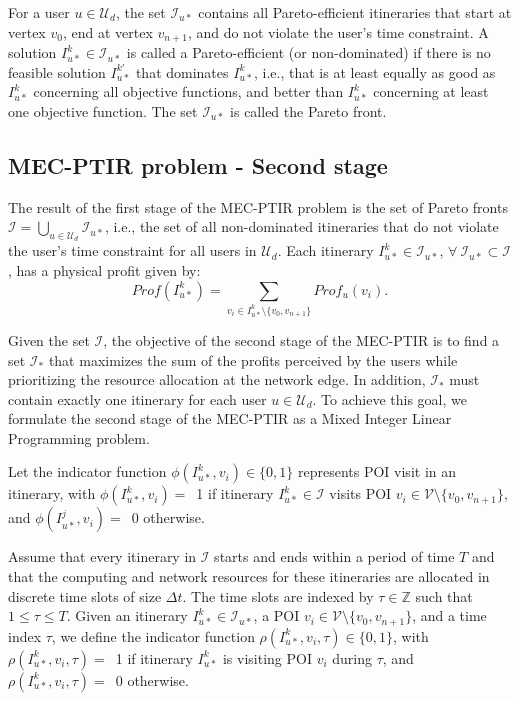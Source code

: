 For a user $u \in \mathcal{U}_d$, the set $\mathcal{I}_{u*}$ contains all Pareto-efficient itineraries that start at vertex $v_0$, end at vertex $v_{n+1}$, and do not violate the user's time constraint. A solution $I_{u*}^{k} \in \mathcal{I}_{u*}$ is called a Pareto-efficient (or non-dominated) if there is no feasible solution $I_{u*}^{k'}$ that dominates $I_{u*}^{k}$, i.e., that is at least equally as good as $I_{u*}^{k}$ concerning all objective functions, and better than $I_{u*}^{k}$ concerning at least one objective function. The set $\mathcal{I}_{u*}$ is called the Pareto front.  

\subsection{MEC-PTIR problem - Second stage}
\label{sec:problem-formulation-second-stage}
The result of the first stage of the MEC-PTIR problem is the set of Pareto fronts $\mathcal{I} = \bigcup_{u \in \mathcal{U}_d} \mathcal{I}_{u*}$, i.e., the set of all non-dominated itineraries that do not violate the user's time constraint for all users in $\mathcal{U}_d$. Each itinerary $I_{u*}^k \in \mathcal{I}_{u*}$, $\forall \ \mathcal{I}_{u*} \subset \mathcal{I}$, has a physical profit given by:
\begin{equation}
\label{eq:profit}
Prof(I_{u*}^k) = \sum_{v_i \in I_{u*}^k \setminus \{v_{0}, v_{n+1}\}} Prof_{u}(v_i).
\end{equation}

Given the set $\mathcal{I}$, the objective of the second stage of the MEC-PTIR is to find a set $\mathcal{I_{*}}$ that maximizes the sum of the profits perceived by the users while prioritizing the resource allocation at the network edge. In addition, $\mathcal{I_{*}}$ must contain exactly one itinerary for each user $u \in \mathcal{U}_d$.
To achieve this goal, we formulate the second stage of the MEC-PTIR as a Mixed Integer Linear Programming problem.

Let the indicator function $\phi(I_{u*}^k , v_i) \in \{0,1\}$ represents POI visit in an itinerary, with $\phi(I_{u*}^k , v_i)=$~1 if itinerary $I_{u*}^k \in \mathcal{I}$ visits POI $v_{i} \in \mathcal{V} \setminus \{v_{0}, v_{n+1}\}$, and $\phi(I^{j}_{u*}, v_i)=$~0 otherwise. 

Assume that every itinerary in $\mathcal{I}$ starts and ends within a period of time $T$ and that the computing and network resources for these itineraries are allocated in discrete time slots of size $\Delta t$. The time slots are indexed by $\tau \in \mathbb{Z}$ such that $ 1 \leq \tau \leq T$. Given an itinerary $I_{u*}^k \in \mathcal{I}_{u*}$, a POI $v_{i} \in \mathcal{V} \setminus \{v_{0}, v_{n+1}\}$, and a time index $\tau$, we define the indicator function $\rho(I_{u*}^k, v_{i}, \tau) \in \{0, 1\}$, with $\rho(I_{u*}^k, v_{i}, \tau)=$~1 if itinerary $I_{u*}^k$ is visiting POI $v_{i}$ during $\tau$, and $\rho(I_{u*}^k, v_{i}, \tau)=$~0 otherwise. 

